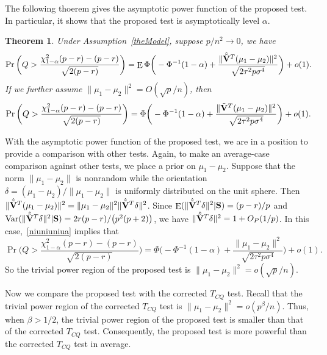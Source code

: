 \documentclass[3p]{elsarticle}
\DeclareMathOperator{\myE}{E}
\DeclareMathOperator{\myVar}{Var}
\theoremstyle{plain}
\newtheorem{theorem}{\quad\quad Theorem}
\theoremstyle{definition}
\theoremstyle{remark}
\begin{document}
The following thoerem gives the asymptotic power function of the proposed test.
 In particular, it shows that the proposed test is asymptotically level $\alpha$.
\begin{theorem}\label{testPowerh}
    Under Assumption~\ref{theModel},
suppose $p/n^2\to 0$, we have
        \begin{equation}\label{niuniuniua}
        \Pr\bigg(Q>\frac{\chi^2_{1-\alpha}(p-r)-(p-r)}{\sqrt{2(p-r)}}\bigg)=
            \myE\Phi\bigg(-\Phi^{-1}(1-\alpha)+\frac{\|\hat{\tilde{\BV}}^T(\mu_1-\mu_2)\|^2}{\sqrt{2\tau^2 p\sigma^4}}\bigg)+o(1)
            .
        \end{equation}
     If we further assume $\|\mu_1-\mu_2\|^2=O({\sqrt{p}}/{n})$, then
    \begin{equation}\label{niuniuniub}
        \Pr\bigg(Q>\frac{\chi^2_{1-\alpha}(p-r)-(p-r)}{\sqrt{2(p-r)}}\bigg)=\Phi\bigg(-\Phi^{-1}(1-\alpha)+\frac{\|\tilde{\mathbf{V}}^T(\mu_1-\mu_2)\|^2}{\sqrt{2\tau^2 p\sigma^4}}\bigg)+o(1).
    \end{equation}
\end{theorem}

With the asymptotic power function of the proposed test, we are in a position to provide a comparison with other tests.
Again, to make an average-case comparison against other tests, we place a prior on $\mu_1-\mu_2$.
Suppose that the norm $\|\mu_1-\mu_2\|$ is nonrandom while the orientation $\delta=(\mu_1-\mu_2)/\|\mu_1-\mu_2\|$ is uniformly distributed on the unit sphere.
Then $\|\hat{\tilde{\mathbf{V}}}^T(\mu_1-\mu_2)\|^2=\|\mu_1-\mu_2\|^2 \|\hat{\tilde{\mathbf{V}}}^T\delta\|^2$.
Since $\myE (\|\hat{\tilde{\BV}}^T\delta\|^2|\BS)=(p-r)/p$ and $\myVar (\|\hat{\tilde{\BV}}^T\delta\|^2|\BS) = 2r(p-r)/\big(p^2(p+2)\big)$, we have $\|\hat{\tilde{\mathbf{V}}}^T\delta\|^2=1+O_P(1/p)$.
In this case,~\eqref{niuniuniua} implies that
    \begin{equation*}
        \Pr\bigg(Q>\frac{\chi^2_{1-\alpha}(p-r)-(p-r)}{\sqrt{2(p-r)}}\bigg)=
        \Phi\bigg(-\Phi^{-1}(1-\alpha)+\frac{\|\mu_1-\mu_2\|^2}{\sqrt{2\tau^2 p\sigma^4}}\bigg)+o(1).
    \end{equation*}
So the trivial power region of the proposed test is $\|\mu_1-\mu_2\|^2= o(\sqrt{p}/n)$.

Now we compare the proposed test with the corrected $T_{CQ}$ test.
Recall that the trivial power region of the corrected $T_{CQ}$ test is $\|\mu_1-\mu_2\|^2=o( p^{\beta}/n)$.
 Thus, when $\beta>1/2$, the trivial power region of the proposed test is smaller than that of the corrected $T_{CQ}$ test.
Consequently, the proposed test is more powerful than the corrected $T_{CQ}$ test in average.
\end{document}
